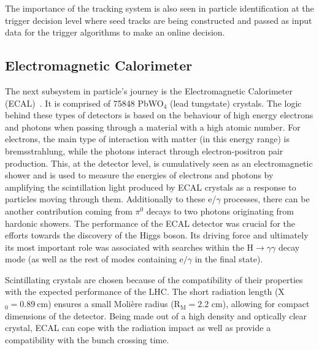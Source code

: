\hspace{10pt} The importance of the tracking system is also seen in particle identification at the trigger decision level where seed tracks are being constructed and passed as input data for the trigger algorithms to make an online decision.



\subsection{Electromagnetic Calorimeter}
\hspace{10pt} The next subsystem in particle's journey is the Electromagnetic Calorimeter (ECAL)~\cite{cms:paper,ECAL_performance}. It is comprised of 75848 PbWO$_{\text{4}}$ (lead tungstate) crystals. The logic behind these types of detectors is based on the behaviour of high energy electrons and photons when passing through a material with a high atomic number. For electrons, the main type of interaction with matter (in this energy range) is bremsstrahlung, while the photons interact through electron-positron pair production. This, at the detector level, is cumulatively seen as an electromagnetic shower and is used to measure the energies of electrons and photons by amplifying the scintillation light produced by ECAL crystals as a response to particles moving through them. Additionally to these e/$\gamma$ processes, there can be another contribution coming from $\pi^\text{0}$ decays to two photons originating from hardonic showers. The performance of the ECAL detector was crucial for the efforts towards the discovery of the Higgs boson. Its driving force and ultimately its most important role was associated with searches within the $\text{H}\rightarrow \gamma\gamma$ decay mode (as well as the rest of modes containing $\text{e}/\gamma$ in the final state). 

\hspace{10pt} Scintillating crystals are chosen because of the compatibility of their properties with the expected performance of the LHC. The short radiation length (X$_\text{0}=\text{0.89}~\text{cm}$) ensures a small Moli\`ere radius (R$_\text{M}=\text{2.2~cm}$), allowing for compact dimensions of the detector. Being made out of a high density and optically clear crystal, ECAL can cope with the radiation impact as well as provide a compatibility with the bunch crossing time.%

